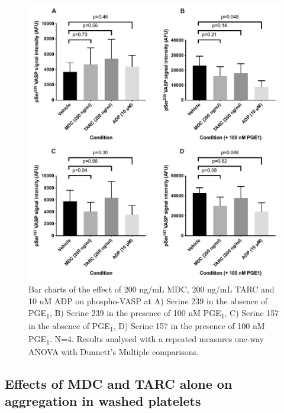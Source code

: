 \documentclass[11pt,twoside]{bristolthesis}
\begin{document}
\begin{figure}
\includegraphics{figure/Chemokines/Layouts/MDC_TARC_WB_VASP} \caption[Quantification of the effect of MDC, TARC and ADP on PGE\textsubscript{1} stimulated phospho-VASP.]{Bar charts of the effect of 200 ng/mL MDC, 200 ng/mL TARC and 10 uM ADP on phospho-VASP at A) Serine 239 in the absence of PGE\textsubscript{1}, B) Serine 239 in the presence of 100 nM PGE\textsubscript{1}, C) Serine 157 in the absence of PGE\textsubscript{1}, D) Serine 157 in the presence of 100 nM PGE\textsubscript{1}. N=4. Results analysed with a repeated measures one-way ANOVA with Dunnett's Multiple comparisons.}\label{fig:MDC-TARC-wp-VASP-bar}
\end{figure}
\hypertarget{effects-of-mdc-and-tarc-alone-on-aggregation-in-washed-platelets}{%
\subsection{Effects of MDC and TARC alone on aggregation in washed platelets}\label{effects-of-mdc-and-tarc-alone-on-aggregation-in-washed-platelets}}
\end{document}
